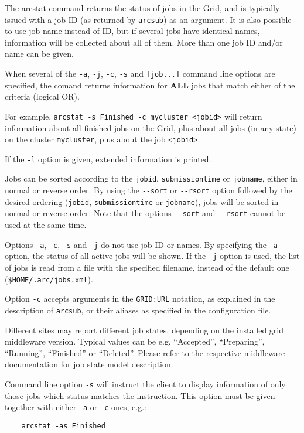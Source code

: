The arcstat command returns the status of jobs in the Grid, and is typically issued with a
job ID (as returned by \verb#arcsub#) as an argument. It is also possible to use job name instead of
ID, but if several jobs have identical names, information will be collected about all of them.
More than one job ID and/or name can be given.

\begin{framed}
  When several of the \verb#-a#,  \verb#-j#, \verb#-c#, \verb#-s# and \verb#[job...]#
  command line options are specified, the comand returns information for \textbf{ALL} jobs that
  match either of the criteria (logical OR).

  For example, \verb#arcstat -s Finished -c mycluster <jobid># will return information about all finished
  jobs on the Grid, plus about all jobs (in any state) on the cluster \verb#mycluster#, plus about the job \verb#<jobid>#.
\end{framed}

If the \verb#-l# option is given, extended information is printed.

Jobs can be sorted according to the \texttt{jobid},
\texttt{submissiontime} or \texttt{jobname}, either in normal or
reverse order. By using the \verb#--sort# or \verb#--rsort# option
followed by the desired ordering (\texttt{jobid},
\texttt{submissiontime} or \texttt{jobname}), jobs will be sorted in
normal or reverse order. Note that the options \verb#--sort# and
\verb#--rsort# cannot be used at the same time.

Options \verb#-a#, \verb#-c#, \verb#-s# and \verb#-j# do not use job ID or names. By
specifying the \verb#-a# option, the status of all active jobs will be shown. If the \verb#-j# option
is used, the list of jobs is read from a file with the specified filename, instead of
the default one (\texttt{{\$}HOME/.arc/jobs.xml}).

Option \verb#-c# accepts arguments in the \texttt{GRID:URL} notation,
as explained in the description of \texttt{arcsub}, or their aliases as
specified in the configuration file.

Different sites may report different job states, depending on
the installed grid middleware version. Typical values can be e.g.
``Accepted'', ``Preparing'', ``Running'', ``Finished'' or ``Deleted''.
Please refer to the respective middleware documentation for job state model
description.

Command line option \verb#-s# will instruct the client to display information
of only those jobs which status matches the instruction. This option must be given
together with either \verb#-a# or \verb#-c# ones, e.g.:
\begin{verbatim}
    arcstat -as Finished
\end{verbatim}


